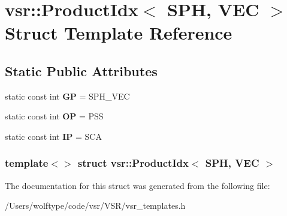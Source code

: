 \hypertarget{structvsr_1_1_product_idx_3_01_s_p_h_00_01_v_e_c_01_4}{\section{vsr\-:\-:Product\-Idx$<$ S\-P\-H, V\-E\-C $>$ Struct Template Reference}
\label{structvsr_1_1_product_idx_3_01_s_p_h_00_01_v_e_c_01_4}
}
\subsection*{Static Public Attributes}
\begin{DoxyCompactItemize}
\item 
\hypertarget{structvsr_1_1_product_idx_3_01_s_p_h_00_01_v_e_c_01_4_a08b7d00fb13d05bfc9a4dc23b75c1427}{static const int {\bfseries G\-P} = S\-P\-H\-\_\-\-V\-E\-C}\label{structvsr_1_1_product_idx_3_01_s_p_h_00_01_v_e_c_01_4_a08b7d00fb13d05bfc9a4dc23b75c1427}

\item 
\hypertarget{structvsr_1_1_product_idx_3_01_s_p_h_00_01_v_e_c_01_4_a0f55e3be904bd41beb457fb2ea8ad4fd}{static const int {\bfseries O\-P} = P\-S\-S}\label{structvsr_1_1_product_idx_3_01_s_p_h_00_01_v_e_c_01_4_a0f55e3be904bd41beb457fb2ea8ad4fd}

\item 
\hypertarget{structvsr_1_1_product_idx_3_01_s_p_h_00_01_v_e_c_01_4_a845f0e49c50fdc57bb949a3ad8ab6b46}{static const int {\bfseries I\-P} = S\-C\-A}\label{structvsr_1_1_product_idx_3_01_s_p_h_00_01_v_e_c_01_4_a845f0e49c50fdc57bb949a3ad8ab6b46}

\end{DoxyCompactItemize}
\subsubsection*{template$<$$>$ struct vsr\-::\-Product\-Idx$<$ S\-P\-H, V\-E\-C $>$}



The documentation for this struct was generated from the following file\-:\begin{DoxyCompactItemize}
\item 
/\-Users/wolftype/code/vsr/\-V\-S\-R/vsr\-\_\-templates.\-h\end{DoxyCompactItemize}
